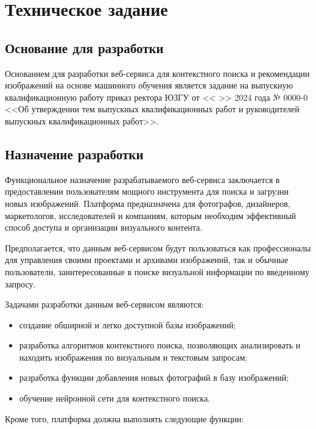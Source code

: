\newsection
\section{Техническое задание}
\subsection{Основание для разработки}

Основанием для разработки веб-сервиса для контекстного поиска и рекомендации изображений на основе машинного обучения является задание на выпускную квалификационную работу приказ ректора ЮЗГУ от <<  >>     2024 года № 0000-0 <<Об утверждении тем выпускных квалификационных работ и руководителей выпускных квалификационных работ>>.

\subsection{Назначение разработки}

Функциональное назначение разрабатываемого веб-сервиса заключается в предоставлении пользователям мощного инструмента для поиска и загрузни новых изображений. Платформа предназначена для фотографов, дизайнеров, маркетологов, исследователей и компаниям, которым необходим эффективный способ доступа и организации визуального контента.

Предполагается, что данным веб-сервисом будут пользоваться как профессионалы для управления своими проектами и архивами изображений, так и обычные пользователи, заинтересованные в поиске визуальной информации по введенному запросу.

Задачами разработки данным веб-сервисом являются:
\begin{itemize}
	\item создание обширной и легко доступной базы изображений;
	\item разработка алгоритмов контекстного поиска, позволяющих анализировать и находить изображения по визуальным и текстовым запросам;
	\item разработка функции добавления новых фотографий в базу изображений;
	\item обучение нейронной сети для контекстного поиска.
\end{itemize}

Кроме того, платформа должна выполнять следующие функции:


